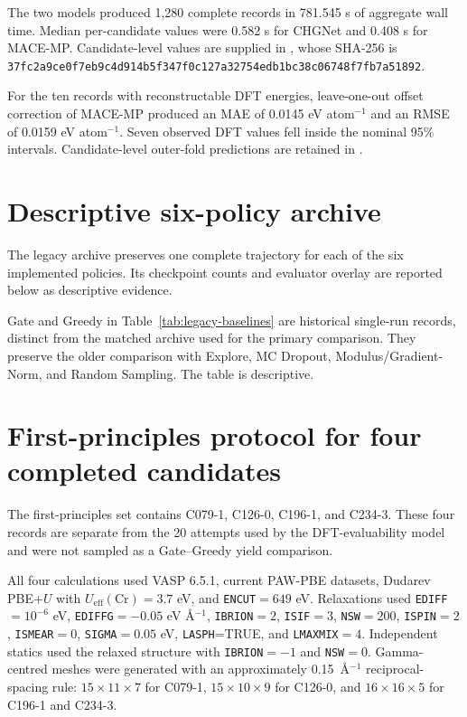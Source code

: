 \documentclass[cmc,article,submit,moreauthors,pdftex]{Definitions/tsp}
\begin{document}
The two models produced 1,280 complete records in 781.545 s of aggregate wall
time. Median per-candidate values were 0.582 s for CHGNet and 0.408 s for
MACE-MP.
Candidate-level values are supplied in
, whose SHA-256 is
\texttt{37fc2a9ce0f7eb9c4d914b5f347f0c127a32754edb1bc38c06748f7fb7a51892}.

For the ten records with reconstructable DFT energies, leave-one-out offset
correction of MACE-MP produced an MAE of 0.0145 eV atom$^{-1}$ and an RMSE of
0.0159 eV atom$^{-1}$. Seven observed DFT values fell inside the nominal 95\%
intervals. Candidate-level outer-fold predictions are retained in
.

\section{Descriptive six-policy archive}

The legacy archive preserves one complete trajectory for each of the six
implemented policies. Its checkpoint counts and evaluator overlay are reported
below as descriptive evidence.



Gate and Greedy in Table~\ref{tab:legacy-baselines} are historical single-run
records, distinct from the matched archive used for the primary comparison.
They preserve the older comparison with Explore, MC Dropout,
Modulus/Gradient-Norm, and Random Sampling. The table is descriptive.

\section{First-principles protocol for four completed candidates}

The first-principles set contains C079-1, C126-0, C196-1, and C234-3. These four
records are separate from the 20 attempts used by the DFT-evaluability model and
were not sampled as a Gate--Greedy yield comparison.

All four calculations used VASP 6.5.1, current PAW-PBE datasets, Dudarev
PBE+$U$ with $U_{\mathrm{eff}}(\mathrm{Cr})=3.7$ eV, and
\texttt{ENCUT}$=649$ eV. Relaxations used \texttt{EDIFF}$=10^{-6}$ eV,
\texttt{EDIFFG}$=-0.05$ eV \AA$^{-1}$, \texttt{IBRION}$=2$,
\texttt{ISIF}$=3$, \texttt{NSW}$=200$, \texttt{ISPIN}$=2$,
\texttt{ISMEAR}$=0$, \texttt{SIGMA}$=0.05$ eV,
\texttt{LASPH}=TRUE, and \texttt{LMAXMIX}$=4$. Independent statics used the
relaxed structure with \texttt{IBRION}$=-1$ and \texttt{NSW}$=0$.
Gamma-centred meshes were generated with an approximately
0.15~\AA$^{-1}$ reciprocal-spacing rule: $15\times11\times7$ for C079-1,
$15\times10\times9$ for C126-0, and $16\times16\times5$ for C196-1 and
C234-3.
\end{document}
